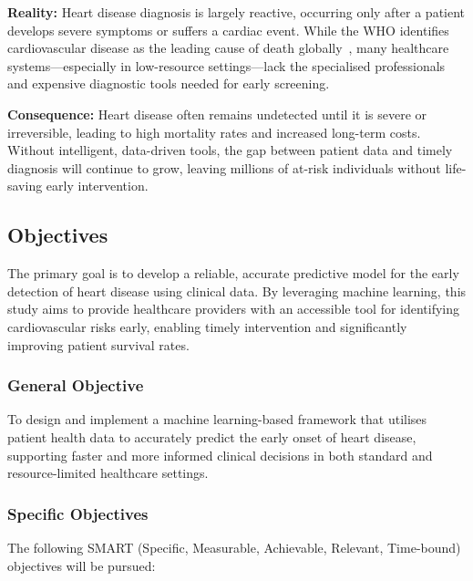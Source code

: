 \documentclass[12pt, a4paper]{article}
\begin{document}
\textbf{Reality:} Heart disease diagnosis is largely reactive, occurring only after a patient develops severe symptoms or suffers a cardiac event. While the WHO identifies cardiovascular disease as the leading cause of death globally~\cite{who2023}, many healthcare systems---especially in low-resource settings---lack the specialised professionals and expensive diagnostic tools needed for early screening.

\textbf{Consequence:} Heart disease often remains undetected until it is severe or irreversible, leading to high mortality rates and increased long-term costs. Without intelligent, data-driven tools, the gap between patient data and timely diagnosis will continue to grow, leaving millions of at-risk individuals without life-saving early intervention.

\subsection{Objectives}

The primary goal is to develop a reliable, accurate predictive model for the
early detection of heart disease using clinical data. By leveraging machine
learning, this study aims to provide healthcare providers with an accessible
tool for identifying cardiovascular risks early, enabling timely intervention
and significantly improving patient survival rates.

\subsubsection{General Objective}
To design and implement a machine learning-based framework that utilises patient
health data to accurately predict the early onset of heart disease, supporting
faster and more informed clinical decisions in both standard and resource-limited
healthcare settings.

\subsubsection{Specific Objectives}
The following SMART (Specific, Measurable, Achievable, Relevant, Time-bound)
objectives will be pursued:
\end{document}
